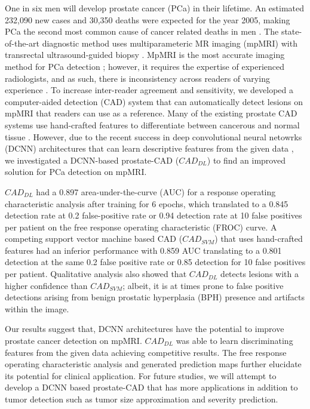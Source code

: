 One in six men will develop prostate cancer (PCa) in their lifetime. An estimated 232,090 new cases and 30,350 deaths were expected for the year 2005, making PCa the second most common cause of cancer related deaths in men \cite{jemal2005cancer}. The state-of-the-art diagnostic method uses multiparameteric MR imaging (mpMRI) with transrectal ultrasound-guided biopsy \cite{costa2015mr}. MpMRI is the most accurate imaging method for PCa detection \cite{cornud2012value}; however, it requires the expertise of experienced radiologists, and as such, there is inconsistency across readers of varying experience \cite{ruprecht2012mri}. To increase inter-reader agreement and sensitivity, we developed a computer-aided detection (CAD) system that can automatically detect lesions on mpMRI that readers can use as a reference. Many of the existing prostate CAD systems use hand-crafted features to differentiate between cancerous and normal tissue \cite{carlsson2012prostate,kwak2015automated,litjens2014computer,wang2014computer}. However, due to the recent success in deep convolutional neural netowrks (DCNN) architectures that can learn descriptive features from the given data \cite{lecun2015deep}, we investigated a DCNN-based prostate-CAD ($CAD_{DL}$) to find an improved solution for PCa detection on mpMRI.

$CAD_{DL}$ had a 0.897 area-under-the-curve (AUC) for a response operating characteristic analysis after training for 6 epochs, which translated to a 0.845 detection rate at 0.2 false-positive rate or 0.94 detection rate at 10 false positives per patient on the free response operating characteristic (FROC) curve. A competing support vector machine based CAD ($CAD_{SVM}$) that uses hand-crafted features had an inferior performance with 0.859 AUC translating to a 0.801 detection at the same 0.2 false positive rate or 0.85 detection for 10 false positives per patient. Qualitative analysis also showed that $CAD_{DL}$ detects lesions with a higher confidence than $CAD_{SVM}$; albeit, it is at times prone to false positive detections arising from benign prostatic hyperplasia (BPH) presence and artifacts within the image. 

Our results suggest that, DCNN architectures have the potential to improve prostate cancer detection on mpMRI. $CAD_{DL}$ was able to learn discriminating features from the given data achieving competitive results. The free response operating characteristic analysis and generated prediction maps further elucidate its potential for clinical application. For future studies, we will attempt to develop a DCNN based prostate-CAD that has more applications in addition to tumor detection such as tumor size approximation and severity prediction.
